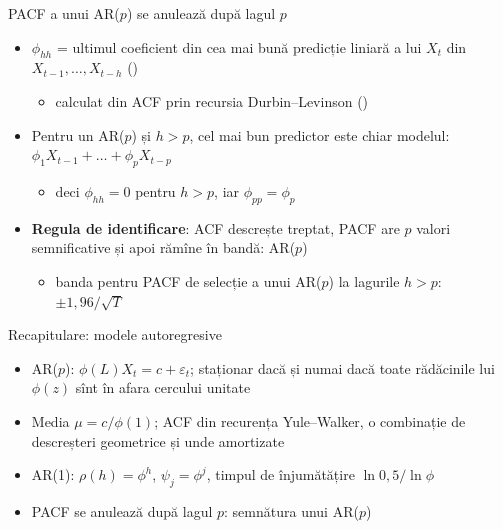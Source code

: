 \begin{frame}{PACF a unui AR($p$) se anulează după lagul $p$}
\itemsize{\small}
\begin{itemize}
    \item $\phi_{hh}$ = ultimul coeficient din cea mai bună predicție liniară a lui $X_t$ din $X_{t-1}, \dots, X_{t-h}$ ()
    \begin{itemize}
        \item calculat din ACF prin recursia Durbin--Levinson ()
    \end{itemize}
    \item Pentru un AR($p$) și $h > p$, cel mai bun predictor este chiar modelul: $\phi_1X_{t-1} + \dots + \phi_pX_{t-p}$
    \begin{itemize}
        \item deci $\phi_{hh} = 0$ pentru $h > p$, iar $\phi_{pp} = \phi_p$
    \end{itemize}
    \item \textbf{Regula de identificare}: ACF descrește treptat, PACF are $p$ valori semnificative și apoi rămîne în bandă: AR($p$)
    \begin{itemize}
        \item banda pentru PACF de selecție a unui AR($p$) la lagurile $h > p$: $\pm 1{,}96/\sqrt{T}$
    \end{itemize}
\end{itemize}
\end{frame}

\begin{frame}{Recapitulare: modele autoregresive}
\itemsize{\small}
\begin{itemize}
    \item AR($p$): $\phi(L)X_t = c + \varepsilon_t$; staționar dacă și numai dacă toate rădăcinile lui $\phi(z)$ sînt în afara cercului unitate
    \item Media $\mu = c/\phi(1)$; ACF din recurența Yule--Walker, o combinație de descreșteri geometrice și unde amortizate
    \item AR(1): $\rho(h) = \phi^h$, $\psi_j = \phi^j$, timpul de înjumătățire $\ln 0{,}5/\ln\phi$
    \item PACF se anulează după lagul $p$: semnătura unui AR($p$)
\end{itemize}
\end{frame}


